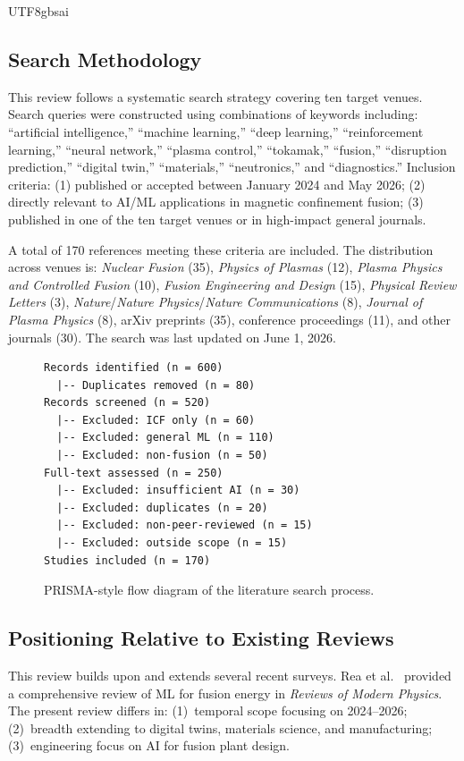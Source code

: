 \documentclass[12pt,a4paper]{article}
\begin{document}
\begin{CJK}{UTF8}{gbsai}
\subsection{Search Methodology}

This review follows a systematic search strategy covering ten target venues. Search queries were constructed using combinations of keywords including: ``artificial intelligence,'' ``machine learning,'' ``deep learning,'' ``reinforcement learning,'' ``neural network,'' ``plasma control,'' ``tokamak,'' ``fusion,'' ``disruption prediction,'' ``digital twin,'' ``materials,'' ``neutronics,'' and ``diagnostics.'' Inclusion criteria: (1) published or accepted between January 2024 and May 2026; (2) directly relevant to AI/ML applications in magnetic confinement fusion; (3) published in one of the ten target venues or in high-impact general journals.

A total of 170 references meeting these criteria are included. The distribution across venues is: \textit{Nuclear Fusion} (35), \textit{Physics of Plasmas} (12), \textit{Plasma Physics and Controlled Fusion} (10), \textit{Fusion Engineering and Design} (15), \textit{Physical Review Letters} (3), \textit{Nature}/\textit{Nature Physics}/\textit{Nature Communications} (8), \textit{Journal of Plasma Physics} (8), arXiv preprints (35), conference proceedings (11), and other journals (30). The search was last updated on June 1, 2026.

\begin{figure}[htbp]
\centering
\small
\begin{verbatim}
Records identified (n = 600)
  |-- Duplicates removed (n = 80)
Records screened (n = 520)
  |-- Excluded: ICF only (n = 60)
  |-- Excluded: general ML (n = 110)
  |-- Excluded: non-fusion (n = 50)
Full-text assessed (n = 250)
  |-- Excluded: insufficient AI (n = 30)
  |-- Excluded: duplicates (n = 20)
  |-- Excluded: non-peer-reviewed (n = 15)
  |-- Excluded: outside scope (n = 15)
Studies included (n = 170)
\end{verbatim}
\caption{PRISMA-style flow diagram of the literature search process.}
\label{fig:prisma}
\end{figure}

\subsection{Positioning Relative to Existing Reviews}

This review builds upon and extends several recent surveys. Rea et al.~\citep{Rea2024RMP} provided a comprehensive review of ML for fusion energy in \textit{Reviews of Modern Physics}. The present review differs in: (1)~temporal scope focusing on 2024--2026; (2)~breadth extending to digital twins, materials science, and manufacturing; (3)~engineering focus on AI for fusion plant design.


\end{CJK}
\end{document}
